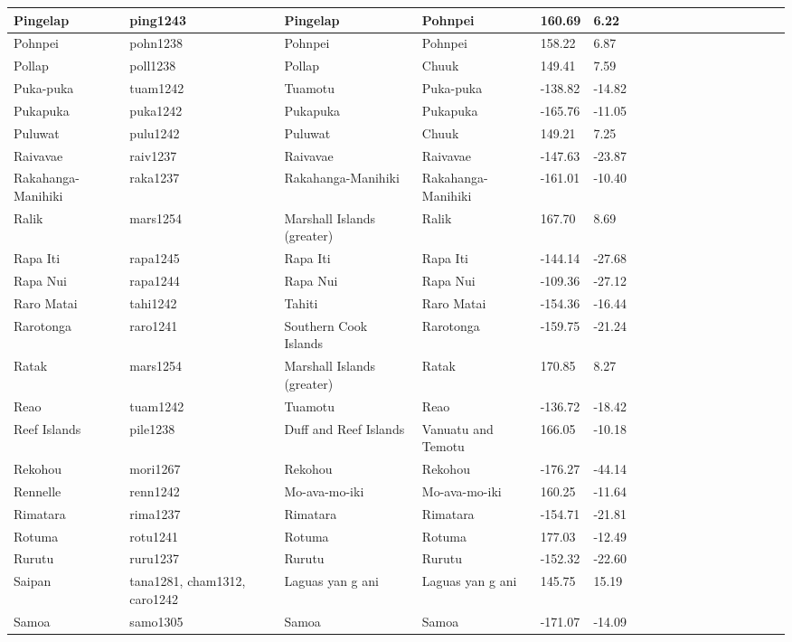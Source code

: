 \documentclass[draft,10pt]{article} %
\begin{document}
\begin{landscape}
\begin{longtable}{| p{2.5cm} |  p{7cm} | p{2.5cm}  | p{2.5cm}  | p{2.5cm}  | p{2.5cm}  | p{2.5cm}  | p{2cm}  | p{1cm} | p{1cm}  | p{1cm} | p{1cm}  | p{1.5cm}  | p{1cm} | p{1cm}  | p{1cm}  |p{1cm}  | p{1cm}    |}
 Pingelap & ping1243 & Pingelap & Pohnpei & 160.69 & 6.22 \\ \hline
 Pohnpei & pohn1238 & Pohnpei & Pohnpei & 158.22 & 6.87 \\ \hline
 Pollap & poll1238 & Pollap & Chuuk & 149.41 & 7.59 \\ \hline
 Puka-puka & tuam1242 & Tuamotu & Puka-puka & -138.82 & -14.82 \\ \hline
 Pukapuka & puka1242 & Pukapuka & Pukapuka & -165.76 & -11.05 \\ \hline
 Puluwat & pulu1242 & Puluwat & Chuuk & 149.21 & 7.25 \\ \hline
 Raivavae & raiv1237 & Raivavae & Raivavae & -147.63 & -23.87 \\ \hline
 Rakahanga-Manihiki & raka1237 & Rakahanga-Manihiki & Rakahanga-Manihiki & -161.01 & -10.40 \\ \hline
 Ralik & mars1254 & Marshall Islands (greater) & Ralik & 167.70 & 8.69 \\ \hline
 Rapa Iti & rapa1245 & Rapa Iti & Rapa Iti & -144.14 & -27.68 \\ \hline
 Rapa Nui & rapa1244 & Rapa Nui & Rapa Nui & -109.36 & -27.12 \\ \hline
 Raro Matai & tahi1242 & Tahiti & Raro Matai & -154.36 & -16.44 \\ \hline
 Rarotonga & raro1241 & Southern Cook Islands & Rarotonga & -159.75 & -21.24 \\ \hline
 Ratak & mars1254 & Marshall Islands (greater) & Ratak & 170.85 & 8.27 \\ \hline
 Reao & tuam1242 & Tuamotu & Reao & -136.72 & -18.42 \\ \hline
 Reef Islands & pile1238 & Duff and Reef Islands & Vanuatu and Temotu & 166.05 & -10.18 \\ \hline
 Rekohou & mori1267 & Rekohou & Rekohou & -176.27 & -44.14 \\ \hline
 Rennelle & renn1242 & Mo-ava-mo-iki & Mo-ava-mo-iki & 160.25 & -11.64 \\ \hline
 Rimatara & rima1237 & Rimatara & Rimatara & -154.71 & -21.81 \\ \hline
 Rotuma & rotu1241 & Rotuma & Rotuma & 177.03 & -12.49 \\ \hline
 Rurutu & ruru1237 & Rurutu & Rurutu & -152.32 & -22.60 \\ \hline
 Saipan & tana1281,  cham1312,  caro1242 & Laguas yan g ani & Laguas yan g ani & 145.75 & 15.19 \\ \hline
 Samoa & samo1305 & Samoa & Samoa & -171.07 & -14.09 \\ \hline

\end{longtable}
\end{landscape}
\end{document}
